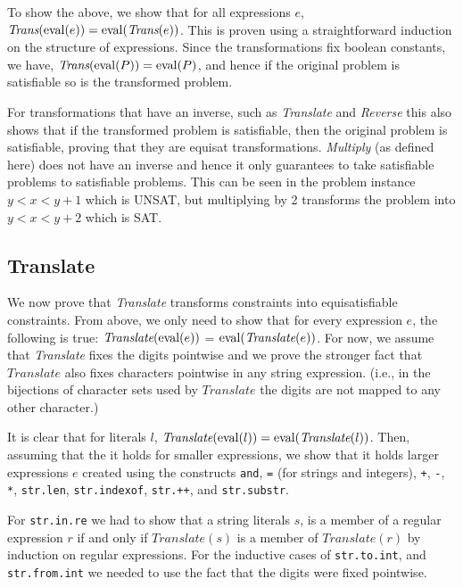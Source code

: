 To show the above, we show that for all expressions $e$,
$\textit{Trans}(\operatorname{eval} (e)) = \operatorname{eval} (\textit{Trans}(e))$. This is
proven using a straightforward induction on the structure of
expressions. Since the transformations fix boolean constants, we have,
$\textit{Trans}(\operatorname{eval} (P)) = \operatorname{eval} (P)$, and hence if the original
problem is satisfiable so is the transformed problem.

For transformations that have an inverse, such as \textit{Translate}
and \textit{Reverse} this also shows that if the transformed problem
is satisfiable, then the original problem is satisfiable, proving that
they are equisat transformations. \textit{Multiply} (as defined here)
does not have an inverse and hence it only guarantees to take
satisfiable problems to satisfiable problems. This can be seen in the
problem instance $y<x<y+1$ which is UNSAT, but multiplying by 2
transforms the problem into $y<x<y+2$ which is SAT.

\subsection{Translate}
We now prove that \textit{Translate} transforms constraints into
equisatisfiable constraints. From above, we only need to show that for
every expression $e$, the following is true: $\textit{Translate}(\operatorname{eval}
(e))$ = $\operatorname{eval} (\textit{Translate}(e))$. For now, we assume that
\textit{Translate} fixes the digits pointwise and we prove the
stronger fact that $\textit{Translate}$ also fixes characters
pointwise in any string expression. (i.e., in the bijections of
character sets used by $\textit{Translate}$ the digits are not mapped
to any other character.)

It is clear that for literals $l$, $\textit{Translate}(\operatorname{eval} (l)) =
\operatorname{eval} (\textit{Translate}(l))$. Then, assuming that the it holds for
smaller expressions, we show that it holds larger expressions $e$
created using the constructs \texttt{and}, \texttt{=} (for strings and
integers), \texttt{+}, \texttt{-}, \texttt{*}, \texttt{str.len},
\texttt{str.indexof}, \texttt{str.++}, and \texttt{str.substr}.

For \texttt{str.in.re} we had to show that a string literals $s$, is a
member of a regular expression $r$ if and only if
$\textit{Translate}(s)$ is a member of $\textit{Translate}(r)$ by
induction on regular expressions. For the inductive cases of
\texttt{str.to.int}, and \texttt{str.from.int} we needed to use the
fact that the digits were fixed pointwise.


